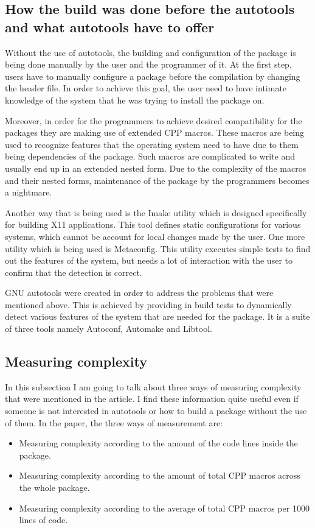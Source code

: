 \documentclass[11pt]{article}
\begin{document}
\subsection{How the build was done before the autotools and what autotools have to offer}
Without the use of autotools, the building and configuration of the package is being done manually by the user and the programmer of it. At the first step, users have to manually configure a package before the compilation by changing the header file. In order to achieve this goal, the user need to have intimate knowledge of the system that he was trying to install the package on.

Moreover, in order for the programmers to achieve desired compatibility for the packages they are making use of extended CPP macros. These macros are being used to recognize features that the operating system need to have due to them being dependencies of the package. Such macros are complicated to write and usually end up in an extended nested form. Due to the complexity of the macros and their nested forms, maintenance of the package by the programmers becomes a nightmare.

Another way that is being used is the Imake utility which is designed specifically for building X11 applications. This tool defines static configurations for various systems, which cannot be account for local changes made by the user. One more utility which is being used is Metaconfig. This utility executes simple tests to find out the features of the system, but needs a lot of interaction with the user to confirm that the detection is correct.

GNU autotools were created in order to address the problems that were mentioned above. This is achieved by providing in build tests to dynamically detect various features of the system that are needed for the package. It is a suite of three tools namely Autoconf, Automake and Libtool.

\subsection{Measuring complexity}
In this subsection I am going to talk about three ways of measuring complexity that were mentioned in the article. I find these information quite useful even if someone is not interested in autotools or how to build a package without the use of them. In the paper, the three ways of measurement are:
\begin{itemize}
\item Measuring complexity according to the amount of the code lines inside the package.
\item Measuring complexity according to the amount of total CPP macros across the whole package.
\item Measuring complexity according to the average of total CPP macros per 1000 lines of code.
\end{itemize}
\end{document}
